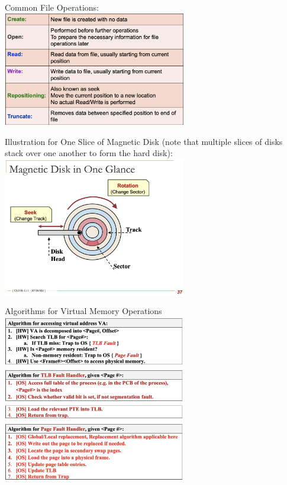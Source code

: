 \documentclass[10pt,landscape,letterpaper]{article}
\begin{document}
\begin{multicols}{3}
Common File Operations:
\\
\includegraphics[width=8cm]{img/12_file_operations.png}

Illustration for One Slice of Magnetic Disk (note that multiple slices of disks stack over one another to form the hard disk):
\\
\includegraphics[width=8cm]{img/13_magnetic_disk_slice.png}

 Algorithms for Virtual Memory Operations
\includegraphics[width=8cm]{img/tut09_vm_algo_a.png}
\includegraphics[width=8cm]{img/tut09_vm_algo_b.png}


\newpage





\end{multicols}
\end{document}
